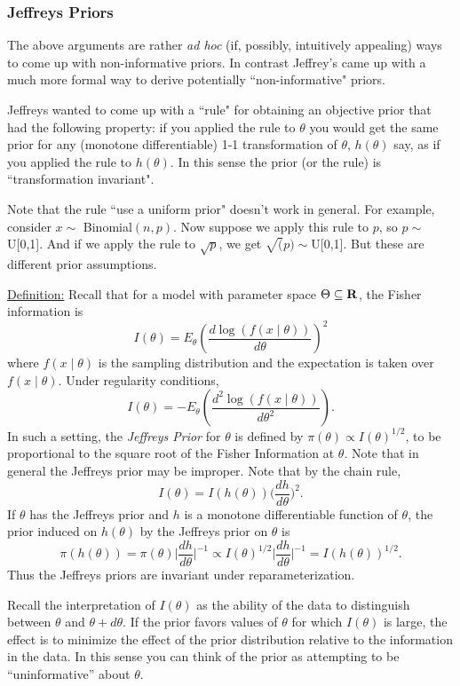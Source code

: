 \documentclass[12pt]{article}
\def\ni{\noindent}
\begin{document}
\subsubsection{Jeffreys Priors}

The above arguments are rather {\it ad hoc} (if, possibly, intuitively appealing)
ways to come up with non-informative priors. 
In contrast Jeffrey's came up with a much more formal way to derive potentially ``non-informative" priors.

Jeffreys wanted to come up with a ``rule" for obtaining an objective prior that had the following property: if you applied the rule to $\theta$
you would get the same prior for any (monotone differentiable) 1-1 transformation of $\theta$, $h(\theta)$ say, as if you applied the rule to $h(\theta)$. In this sense the prior (or the rule) is ``transformation invariant".

Note that the rule ``use a uniform prior" doesn't work in general. For example, consider $x\sim$ Binomial$(n,p)$.  Now suppose we apply this rule to $p$, so $p\sim$ U[0,1]. And if we apply the rule to $\sqrt{p}$, we get $\sqrt(p) \sim $U[0,1]. But these are different  prior assumptions.




\ni\underline{Definition:}  Recall that for a model with parameter space
$\Theta \subseteq \bf{R}$, the Fisher information is
$$I(\theta)=E_{\theta} \left(\frac{d\log(f(x\mid \theta))}{d\theta}
\right)^2$$
where $f(x\mid \theta)$ is the sampling distribution and the
expectation is taken over $f(x\mid \theta)$.  Under regularity
conditions,
$$I(\theta)=-E_{\theta} \left(\frac{d^2 \log(f(x\mid \theta))}{d\theta^2}
\right).$$
In such a setting, the {\it Jeffreys Prior} for $\theta$ is defined by
$\pi(\theta)\propto I(\theta)^{1/2}$, to be proportional to the square
root of the Fisher Information at $\theta$.  Note that in general the
Jeffreys prior may be improper.
\vskip 4mm
Note that by the chain rule,
$$I(\theta)=I(h(\theta)) \Big( \frac{dh}{d\theta} \Big)^2.$$
If $\theta$ has the Jeffreys prior and $h$ is a monotone differentiable
function of $\theta$, the prior induced on $h(\theta)$ by the Jeffreys
prior on $\theta$ is
$$\pi(h(\theta))=\pi(\theta) \big| \frac{dh}{d\theta} \big|^{-1}
\propto I(\theta)^{1/2} \big| \frac{dh}{d\theta}
\big|^{-1}=I(h(\theta))^{1/2}.$$
Thus the Jeffreys priors are invariant under reparameterization.

Recall the interpretation of $I(\theta)$ as the ability of the data to
distinguish between $\theta$ and $\theta+d\theta$.  If the prior
favors values of $\theta$ for which $I(\theta)$ is large, the effect
is to minimize the effect of the prior distribution relative to the
information in the data. In this sense you can 
think of the prior as attempting to be ``uninformative'' about
$\theta$.
\end{document}
